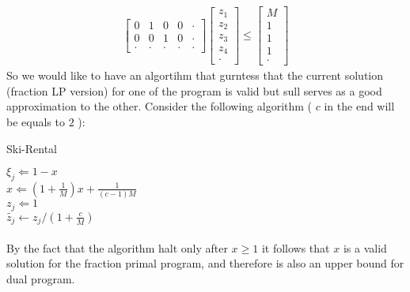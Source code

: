 \documentclass{article}
\begin{document}
\begin{multicols*}{2}
\begin{equation*}
\begin{split}
\begin{bmatrix}
	0 & 1 & 0 & 0 & \cdot \\
	0 & 0 & 1 & 0 & \cdot \\
	\cdot & \cdot & \cdot & \cdot & \cdot
      \end{bmatrix} 
      \begin{bmatrix}
	z_{1} \\
	z_{2} \\ 
	z_{3} \\
	z_{4} \\
	\cdot 
      \end{bmatrix} \le
      \begin{bmatrix}
	M \\
	1 \\ 
	1 \\
	1 \\
	\cdot 
      \end{bmatrix}
    \end{split}
  \end{equation*}
  So we would like to have an algortihm that gurntess that the current solution (fraction LP version) for one of the program is valid but sull serves as a good approximation to the other. Consider the following algorithm ( $c$ in the end will be equals to $2$ ): 

  \begin{algorithm}[H]
    \caption{Ski-Rental}
    \label{alg:three}
     {
       { 
	$ \xi_{j} \Leftarrow 1 - x$ \\
	$ x \Leftarrow \left( 1 + \frac{1}{M} \right) x + \frac{1}{\left( c - 1 \right) M } $ \\
	$ z_{j} \Leftarrow 1$ \\ 
	$\tilde{z_{j}} \leftarrow z_{j} / \left(  1 + \frac{c}{M} \right)  $ 
      }
  }
  \end{algorithm}
  
  \paragraph{}

By the fact that the algorithm halt only after $x \ge 1 $ it follows that $x$ is a valid solution for the fraction primal program, and therefore is also an upper bound for dual program. 


\end{multicols*}
\end{document}
